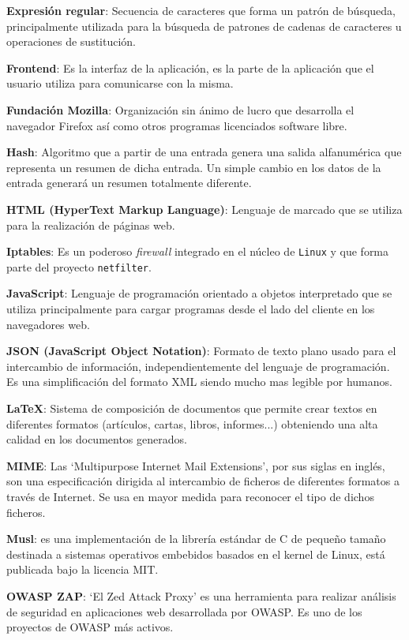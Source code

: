 \textbf{Expresión regular}: Secuencia de caracteres que forma un patrón de búsqueda, principalmente utilizada para la búsqueda de patrones de cadenas de caracteres u operaciones de sustitución.
\bigskip

\textbf{Frontend}: Es la interfaz de la aplicación, es la parte de la aplicación que el usuario utiliza para comunicarse con la misma.
\bigskip

\textbf{Fundación Mozilla}: Organización sin ánimo de lucro que desarrolla el navegador Firefox así como otros programas licenciados software libre.
\bigskip

\textbf{Hash}: Algoritmo que a partir de una entrada genera una salida alfanumérica que representa un resumen de dicha entrada. Un simple cambio en los datos de la entrada generará un resumen totalmente diferente.
\bigskip

\textbf{HTML (HyperText Markup Language)}: Lenguaje de marcado que se utiliza para la realización de páginas web.
\bigskip

\textbf{Iptables}: Es un poderoso \textit{firewall} integrado en el núcleo de \texttt{Linux} y que forma parte del proyecto \texttt{netfilter}.
\bigskip

\textbf{JavaScript}: Lenguaje de programación orientado a objetos interpretado que se utiliza principalmente para cargar programas desde el lado del cliente en los navegadores web.
\bigskip

\textbf{JSON (JavaScript Object Notation)}: Formato de texto plano usado para el intercambio de información, independientemente del lenguaje de programación. Es una simplificación del formato XML siendo mucho mas legible por humanos.
\bigskip

\textbf{LaTeX}: Sistema de composición de documentos que permite crear textos en diferentes formatos (artículos, cartas, libros, informes...) obteniendo una alta calidad en los documentos generados.
\bigskip

\textbf{MIME}: Las `Multipurpose Internet Mail Extensions', por sus siglas en inglés, son una especificación dirigida al intercambio de ficheros de diferentes formatos a través de Internet. Se usa en mayor medida para reconocer el tipo de dichos ficheros.
\bigskip

\textbf{Musl}: es una implementación de la librería estándar de C de pequeño tamaño destinada a sistemas operativos embebidos basados en el kernel de Linux, está publicada bajo la licencia MIT.
\bigskip

\textbf{OWASP ZAP}: `El Zed Attack Proxy' es una herramienta para realizar análisis de seguridad en aplicaciones web desarrollada por OWASP. Es uno de los proyectos de OWASP más activos.
\bigskip

